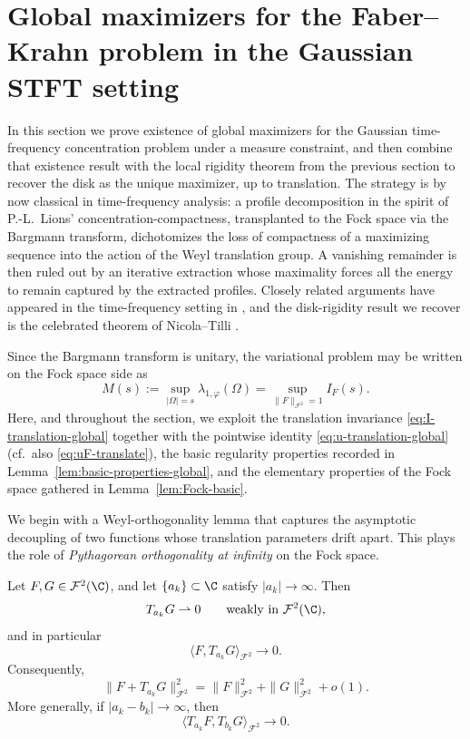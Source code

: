 \section{Global maximizers for the Faber--Krahn problem in the Gaussian STFT setting}

In this section we prove existence of global maximizers for the Gaussian
time-frequency concentration problem under a measure constraint, and then
combine that existence result with the local rigidity theorem from the previous
section to recover the disk as the unique maximizer, up to translation. The
strategy is by now classical in time-frequency analysis: a profile decomposition
in the spirit of P.-L.~Lions' concentration-compactness, transplanted to the
Fock space via the Bargmann transform, dichotomizes the loss of compactness of a
maximizing sequence into the action of the Weyl translation group. A vanishing
remainder is then ruled out by an iterative extraction whose maximality forces
all the energy to remain captured by the extracted profiles. Closely related
arguments have appeared in the time-frequency setting in
\cite{Nicola-Romero-Trapasso, Marceca-Romero-Speckbacher, Fulsche-Hagger,
Samuelsen}, and the disk-rigidity result we recover is the celebrated theorem
of Nicola--Tilli \cite{Nicola-Tilli, Nicola-Tilli-2}.

Since the Bargmann transform is unitary, the variational problem may be written
on the Fock space side as
\[
M(s):=\sup_{|\Omega|=s}\lambda_{1,\varphi}(\Omega)
=
\sup_{\|F\|_{\mathcal F^2}=1} I_F(s).
\]
Here, and throughout the section, we exploit the translation invariance
\eqref{eq:I-translation-global} together with the pointwise identity
\eqref{eq:u-translation-global} (cf.\ also \eqref{eq:uF-translate}), the
basic regularity properties recorded in Lemma~\ref{lem:basic-properties-global},
and the elementary properties of the Fock space gathered in
Lemma~\ref{lem:Fock-basic}.

We begin with a Weyl-orthogonality lemma that captures the asymptotic
decoupling of two functions whose translation parameters drift apart. This
plays the role of \emph{Pythagorean orthogonality at infinity} on the Fock
space.

\begin{lemma}\label{lem:weyl-orthogonality-global}
Let \(F,G\in \mathcal F^2(\C)\), and let \(\{a_k\}\subset \C\) satisfy
\(|a_k|\to \infty\). Then
\[
T_{a_k}G \rightharpoonup 0
\qquad\text{weakly in }\mathcal F^2(\C),
\]
and in particular
\[
\langle F,T_{a_k}G\rangle_{\mathcal F^2}\to 0.
\]
Consequently,
\[
\|F+T_{a_k}G\|_{\mathcal F^2}^2
=
\|F\|_{\mathcal F^2}^2+\|G\|_{\mathcal F^2}^2+o(1).
\]
More generally, if \(|a_k-b_k|\to\infty\), then
\[
\langle T_{a_k}F,T_{b_k}G\rangle_{\mathcal F^2}\to 0.
\]
\end{lemma}

